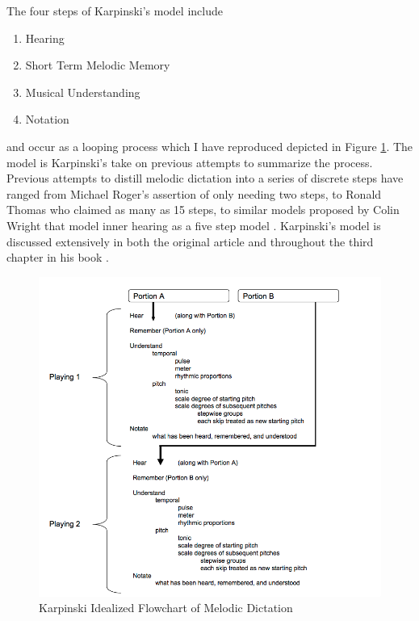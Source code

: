 \documentclass[]{book}
\providecommand{\tightlist}{%
  \setlength{\itemsep}{0pt}\setlength{\parskip}{0pt}}
\begin{document}
The four steps of Karpinski's model include

\begin{enumerate}
\def\labelenumi{\arabic{enumi}.}
\tightlist
\item
  Hearing
\item
  Short Term Melodic Memory
\item
  Musical Understanding
\item
  Notation
\end{enumerate}

and occur as a looping process which I have reproduced depicted in Figure \ref{fig:flowchart}.
The model is Karpinski's take on previous attempts to summarize the process.
Previous attempts to distill melodic dictation into a series of discrete steps have ranged from Michael Roger's assertion of only needing two steps, to Ronald Thomas who claimed as many as 15 steps, to similar models proposed by Colin Wright that model inner hearing as a five step model \citep{wrightInvestigatingAuralCase2016, karpinskiAuralSkillsAcquisition2000}.
Karpinski's model is discussed extensively in both the original article \citep{karpinskiModelMusicPerception1990} and throughout the third chapter in his book \citep{karpinskiAuralSkillsAcquisition2000}.

\begin{figure}

{\centering \includegraphics[width=1\linewidth]{img/karpinski31} 

}

\caption{Karpinski Idealized Flowchart of Melodic Dictation}\label{fig:flowchart}
\end{figure}
\end{document}
